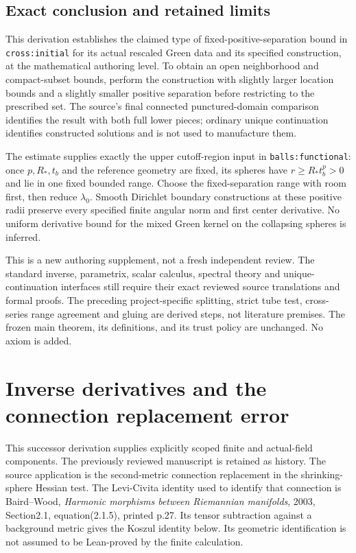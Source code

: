 \documentclass[11pt]{article}
\theoremstyle{definition}
\theoremstyle{remark}
\numberwithin{equation}{section}
\begin{document}
\subsection{Exact conclusion and retained limits}
\label{fixed-separation-supp:limits}

This derivation establishes the claimed type of fixed-positive-separation
bound in \texttt{cross:initial} for its actual rescaled Green data and
its specified construction, at the mathematical authoring level. To
obtain an open neighborhood and compact-subset bounds, perform the
construction with slightly larger location bounds and a slightly
smaller positive separation before restricting to the prescribed set.
The source's final connected punctured-domain comparison identifies
the result with both full lower pieces; ordinary unique continuation
identifies constructed solutions and is not used to manufacture them.

The estimate supplies exactly the upper cutoff-region input in
\texttt{balls:functional}: once $p,R_*,t_b$ and the reference geometry
are fixed, its spheres have $r\ge R_*t_b^p>0$ and lie in one fixed
bounded range. Choose the fixed-separation range with room first, then
reduce $\lambda_0$. Smooth Dirichlet boundary constructions at these
positive radii preserve every specified finite angular norm and first
center derivative. No uniform derivative bound for the mixed Green
kernel on the collapsing spheres is inferred.

This is a new authoring supplement, not a fresh independent review.
The standard inverse, parametrix, scalar calculus, spectral theory and
unique-continuation interfaces still require their exact reviewed
source translations and formal proofs. The preceding project-specific
splitting, strict tube test, cross-series range agreement and gluing
are derived steps, not literature premises. The frozen main theorem,
its definitions, and its trust policy are unchanged. No axiom is added.


\clearpage

\section{Inverse derivatives and the connection replacement error}\label{connection-formal:norms}\label{connection-formal:inverse-derivative}\label{connection-formal:koszul}\label{connection-formal:error}
This successor derivation supplies explicitly scoped finite and actual-field components. The previously reviewed manuscript is retained as history. The source application is the second-metric
connection replacement in the shrinking-sphere Hessian test. The Levi-Civita
identity used to identify that connection is Baird--Wood, \emph{Harmonic
morphisms between Riemannian manifolds}, 2003, Section2.1, equation(2.1.5),
printed p.27. Its tensor subtraction against a background metric gives the
Koszul identity below. Its geometric identification is not assumed to be
Lean-proved by the finite calculation.
\end{document}
